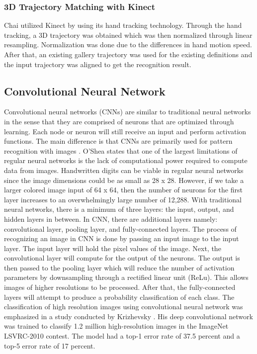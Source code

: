 \documentclass[journal]{./IEEE/IEEEtran}
\begin{document}
\subsubsection{3D Trajectory Matching with Kinect}
Chai \cite{Chai} utilized Kinect by using its hand tracking technology. Through the hand tracking, a 3D trajectory was obtained which was then normalized through linear resampling. Normalization was done due to the differences in hand motion speed. After that, an existing gallery trajectory was used for the existing definitions and the input trajectory was aligned to get the recognition result.
\subsection{Convolutional Neural Network}
Convolutional neural networks (CNNs) are similar to traditional neural networks in the sense that they are comprised of neurons that are optimized through learning. Each node or neuron will still receive an input and perform activation functions. The main difference is that CNNs are primarily used for pattern recognition with images \cite{OShea2015}.
\newline
\indent O'Shea \cite{OShea2015} states that one of the largest limitations of regular neural networks is the lack of computational power required to compute data from images. Handwritten digits can be viable in regular neural networks since the image dimensions could be as small as 28 x 28. However, if we take a larger colored image input of 64 x 64, then the number of neurons for the first layer increases to an overwhelmingly large number of 12,288.
\newline 
\indent With traditional neural networks, there is a minimum of three layers: the input, output, and hidden layers in between. In CNN, there are additional layers namely: convolutional layer, pooling layer, and fully-connected layers. The process of recognizing an image in CNN is done by passing an input image to the input layer. The input layer will hold the pixel values of the image. Next, the convolutional layer will compute for the output of the neurons. The output is then passed to the pooling layer which will reduce the number of activation parameters by downsampling through a rectified linear unit (ReLu). This allows images of higher resolutions to be processed. After that, the fully-connected layers will attempt to produce a probability classification of each class.
\newline
\indent
The classification of high resolution images using convolutional neural network was emphasized in a study conducted by Krizhevsky \cite{Krizhevsky2012}. His deep convolutional network was trained to classify 1.2 million high-resolution images in the ImageNet LSVRC-2010 contest. The model had a top-1 error rate of 37.5 percent and a top-5 error rate of 17 percent.
\end{document}
